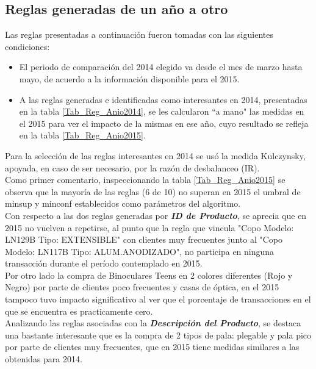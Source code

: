 \documentclass[]{article}
\begin{document}
	\subsection{Reglas generadas de un año a otro}
	Las reglas presentadas a continuación fueron tomadas con las siguientes condiciones:
	\begin{itemize}
		\item El periodo de comparación del 2014 elegido va desde el mes de marzo hasta mayo, de acuerdo a la información disponible para el 2015.
		\item A las reglas generadas e identificadas como interesantes en 2014, presentadas en  la tabla \ref{Tab_Reg_Anio2014}, se les calcularon “a mano" las medidas en el 2015 para ver el impacto de la mismas en ese año, cuyo resultado se refleja en la tabla \ref{Tab_Reg_Anio2015}.
	\end{itemize}
	
	Para la selección de las reglas interesantes en 2014 se usó la medida Kulczynsky, apoyada, en caso de ser necesario, por la razón de desbalanceo (IR). \\
	
	Como primer comentario, inspeccionando la tabla \ref{Tab_Reg_Anio2015} se observa que la mayoría de las reglas (6 de 10) no superan en 2015 el umbral de minsup y minconf establecidos como parámetros del algoritmo. \\
	
	Con respecto a las dos reglas generadas por \textit{\textbf{ID de Producto}}, se aprecia que en 2015 no vuelven a repetirse, al punto que la regla que vincula  "Copo Modelo: LN129B Tipo: EXTENSIBLE" con clientes muy frecuentes junto al "Copo Modelo: LN117B Tipo: ALUM.ANODIZADO", no participa en ninguna transacción durante el período contemplado en 2015.\\
	
	Por otro lado la compra de Binoculares Teens en 2 colores diferentes (Rojo y Negro) por parte de clientes poco frecuentes y casas de óptica, en el 2015 tampoco tuvo impacto significativo al ver que el porcentaje de transacciones en el que se encuentra es practicamente cero.\\
	
	Analizando las reglas asociadas con la \textit{\textbf{Descripción del Producto}}, se destaca una bastante interesante que es la compra de 2 tipos de pala: plegable y pala pico por parte de clientes muy frecuentes, que en 2015 tiene medidas similares a las obtenidas para 2014.\\
		
\end{document}
